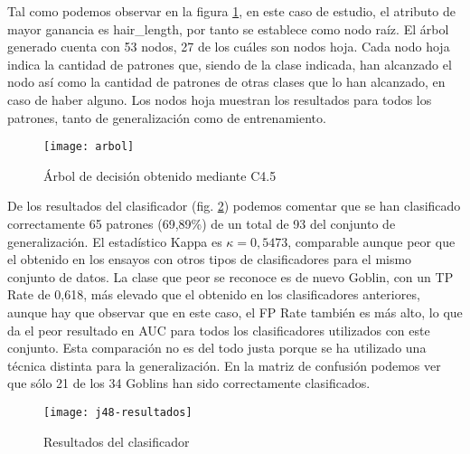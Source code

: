 Tal como podemos observar en la figura \ref{fig:j48-arbol}, en este caso de estudio, el atributo de mayor ganancia es hair\_length, por tanto se establece como nodo raíz. El árbol generado cuenta con 53 nodos, 27 de los cuáles son nodos hoja. Cada nodo hoja indica la cantidad de patrones que, siendo de la clase indicada, han alcanzado el nodo así como la cantidad de patrones de otras clases que lo han alcanzado, en caso de haber alguno. Los nodos hoja muestran los resultados para todos los patrones, tanto de generalización como de entrenamiento.

\begin{landscape}
    \begin{figure}[H]
        \centering
        \texttt{[image: arbol]}
        \caption{Árbol de decisión obtenido mediante C4.5}
        \label{fig:j48-arbol}
    \end{figure}
\end{landscape}

De los resultados del clasificador (fig. \ref{fig:j48-resultados}) podemos comentar que se han clasificado correctamente 65 patrones (69,89\%) de un total de 93 del conjunto de generalización. El estadístico Kappa es $\kappa=0,5473$, comparable aunque peor que el obtenido en los ensayos con otros tipos de clasificadores para el mismo conjunto de datos. La clase que peor se reconoce es de nuevo Goblin, con un TP Rate de 0,618, más elevado que el obtenido en los clasificadores anteriores, aunque hay que observar que en este caso, el FP Rate también es más alto, lo que da el peor resultado en AUC para todos los clasificadores utilizados con este conjunto. Esta comparación no es del todo justa porque se ha utilizado una técnica distinta para la generalización. En la matriz de confusión podemos ver que sólo 21 de los 34 Goblins han sido correctamente clasificados.
    
\begin{figure}[H]
    \centering
    \texttt{[image: j48-resultados]}
    \caption{Resultados del clasificador }
    \label{fig:j48-resultados}
\end{figure}


\clearpage
